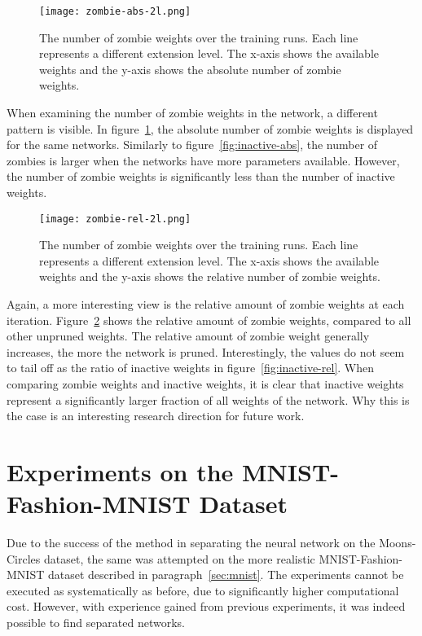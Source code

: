 \begin{figure}[ht]
    \centering
    \texttt{[image: zombie-abs-2l.png]}
    \caption[Zombie weights during training runs, absolute]{
    The number of zombie weights over the training runs. 
    Each line represents a different extension level. 
    The x-axis shows the available weights and the y-axis shows the absolute number of zombie weights.
    }\label{fig:zombie-abs}
\end{figure}
When examining the number of zombie weights in the network, a different pattern is visible.
In figure~\ref{fig:zombie-abs}, the absolute number of zombie weights is displayed for the same networks.
Similarly to figure~\ref{fig:inactive-abs}, the number of zombies is larger when the networks have more parameters available.
However, the number of zombie weights is significantly less than the number of inactive weights.

\begin{figure}[ht]
    \centering
    \texttt{[image: zombie-rel-2l.png]}
    \caption[Zombie weights during training runs, relative]{
        The number of zombie weights over the training runs. 
        Each line represents a different extension level. 
        The x-axis shows the available weights and the y-axis shows the relative number of zombie weights.
    }\label{fig:zombie-rel}
\end{figure}
Again, a more interesting view is the relative amount of zombie weights at each iteration.
Figure~\ref{fig:zombie-rel} shows the relative amount of zombie weights, compared to all other unpruned weights.
The relative amount of zombie weight generally increases, the more the network is pruned.
Interestingly, the values do not seem to tail off as the ratio of inactive weights in figure~\ref{fig:inactive-rel}.
When comparing zombie weights and inactive weights, it is clear that inactive weights represent a significantly larger fraction of all weights of the network.
Why this is the case is an interesting research direction for future work.

\section{Experiments on the MNIST-Fashion-MNIST Dataset}
Due to the success of the method in separating the neural network on the Moons-Circles dataset, the same was attempted on the more realistic MNIST-Fashion-MNIST dataset described in paragraph~\ref{sec:mnist}.
The experiments cannot be executed as systematically as before, due to significantly higher computational cost.
However, with experience gained from previous experiments, it was indeed possible to find separated networks.

